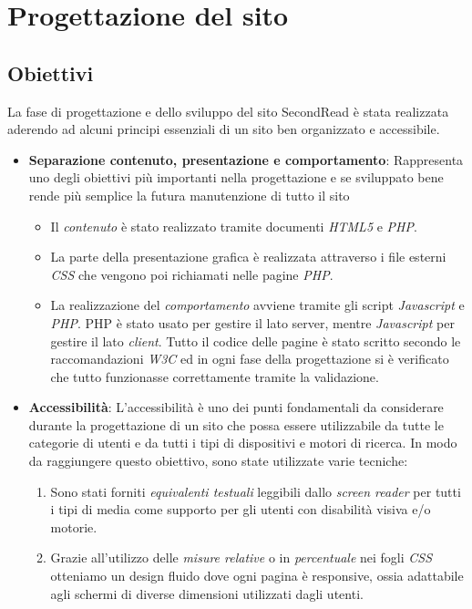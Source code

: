 \section{Progettazione del sito}\label{sec:progettazionesito}

\subsection{Obiettivi}
La fase di progettazione e dello sviluppo del sito SecondRead è stata realizzata aderendo ad alcuni principi essenziali di un sito ben organizzato e accessibile.

\begin{itemize}
	\item \textbf{Separazione contenuto, presentazione e comportamento}: Rappresenta uno degli obiettivi più importanti nella progettazione e se sviluppato bene rende più semplice la futura manutenzione di tutto il sito
		\begin{itemize}
			\item Il \textit{contenuto} è stato realizzato tramite documenti \textit{HTML5} e \textit{PHP}.
			\item La parte della presentazione grafica è realizzata attraverso i file esterni \textit{CSS} che vengono poi richiamati nelle pagine \textit{PHP}.
			\item La realizzazione del \textit{comportamento} avviene tramite gli script \textit{Javascript} e \textit{PHP}. PHP è stato usato per gestire il lato server, mentre \textit{Javascript} per gestire il lato \textit{client}. Tutto il codice delle pagine è stato scritto secondo le raccomandazioni \textit{W3C} ed in ogni fase della progettazione si è verificato che tutto funzionasse correttamente tramite la validazione.	
		\end{itemize}
	\item \textbf{Accessibilità}: L’accessibilità è uno dei punti fondamentali da	considerare durante la progettazione di un sito che possa essere utilizzabile da tutte le categorie di utenti e da tutti i tipi di dispositivi e motori di ricerca. In modo da raggiungere questo obiettivo, sono state utilizzate varie tecniche:
		\begin{enumerate}
			\item Sono stati forniti \textit{equivalenti testuali} leggibili dallo \textit{screen reader} per tutti i tipi di media come supporto per gli utenti con disabilità visiva e/o motorie.
			\item Grazie all’utilizzo delle \textit{misure relative} o in \textit{percentuale} nei fogli \textit{CSS} otteniamo un design fluido dove ogni pagina è responsive, ossia adattabile agli schermi di diverse dimensioni utilizzati dagli utenti.

\end{enumerate}
\end{itemize}
